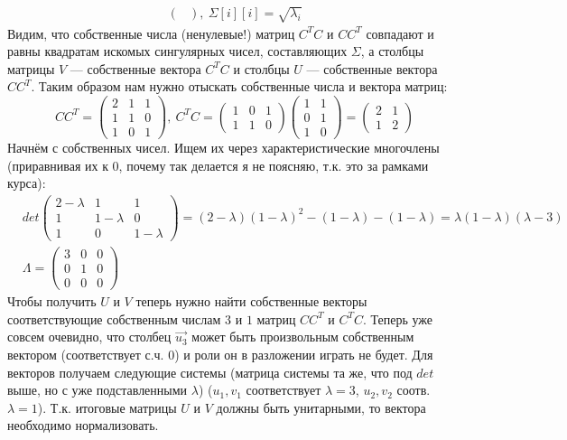 \begin{solution}
\begin{enumerate}
\begin{align*}
\begin{pmatrix}
		\end{pmatrix},
		\ \Sigma[i][i] = \sqrt{\lambda_i}
	\end{align*}
	Видим, что собственные числа (ненулевые!) матриц $C^TC$ и $CC^T$ совпадают и равны квадратам искомых сингулярных чисел, составляющих $\Sigma$, а столбцы матрицы $V$ --- собственные вектора $C^TC$ и столбцы $U$ --- собственные вектора $CC^T$.
	Таким образом нам нужно отыскать собственные числа и вектора матриц:
	\begin{equation*}
	CC^T=
	\begin{pmatrix}
	2 & 1 & 1 \\
	1 & 1 & 0 \\
	1 & 0 & 1 
	\end{pmatrix},\
	C^TC=
	\begin{pmatrix}
	1 & 0 & 1 \\
	1 & 1 & 0 
	\end{pmatrix}
	\begin{pmatrix}
	1 & 1 \\
	0 & 1 \\
	1 & 0
	\end{pmatrix}
	=
	\begin{pmatrix}
	2 & 1 \\
	1 & 2 
	\end{pmatrix}
	\end{equation*}
	Начнём с собственных чисел. Ищем их через характеристические многочлены (приравнивая их к $0$, почему так делается я не поясняю, т.к. это за рамками курса):
	\begin{align*}
	&det
	\begin{pmatrix}
	2 - \lambda & 1 & 1 \\
	1 & 1 - \lambda & 0 \\
	1 & 0 & 1 - \lambda
	\end{pmatrix}
	= (2-\lambda)(1-\lambda)^2-(1-\lambda)-(1-\lambda)=\lambda(1-\lambda)(\lambda-3)
	 \\
	&\Lambda = 
	\begin{pmatrix}
	3 & 0 & 0 \\
	0 & 1 & 0 \\
	0 & 0 & 0
	\end{pmatrix}
	\end{align*}
	Чтобы получить $U$ и $V$ теперь нужно найти собственные векторы соответствующие собственным числам $3$ и $1$ матриц 
	$CC^T$ и $C^TC$. Теперь уже совсем очевидно, что столбец $\vec{u_3}$ может быть произвольным собственным вектором (соответствует с.ч. $0$) и роли он в разложении играть не будет. Для векторов получаем следующие системы (матрица системы та же, что под $det$ выше, но с уже подставленными $\lambda$) ($u_1, v_1$ соответствует $\lambda = 3$, $u_2, v_2$ соотв. $\lambda = 1$). Т.к. итоговые матрицы $U$ и $V$ должны быть унитарными, то вектора необходимо нормализовать.

\end{enumerate}
\end{solution}
